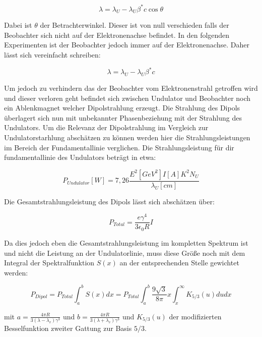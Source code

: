\begin{equation*}
    \lambda = \lambda_U -\lambda_U \beta^*c \cos{\theta}
\end{equation*}

Dabei ist $\theta$ der Betrachterwinkel. Dieser ist von null verschieden falls der Beobachter sich 
nicht auf der Elektronenachse befindet. In den folgenden Experimenten ist der Beobachter jedoch immer
auf der Elektronenachse. Daher lässt sich vereinfacht schreiben:

\begin{equation*}
    \lambda = \lambda_U -\lambda_U \beta^*c
\end{equation*}

Um jedoch zu verhindern das der Beobachter vom Elektronenstrahl getroffen wird und dieser verloren geht
befindet sich zwischen Undulator und Beobachter noch ein Ablenkmagnet welcher Dipolstrahlung erzeugt.
Die Strahlung des Dipols überlagert sich nun mit unbekannter Phasenbeziehung mit der Strahlung des 
Undulators. Um die Relevanz der Dipolstrahlung im Vergleich zur Undulatorstarhlung abschätzen zu können
werden hier die Strahlungsleistungen im Bereich der Fundamentallinie verglichen.
Die Strahlungsleistung für dir fundamentallinie des Undulators beträgt in etwa:

\begin{equation*}
    P_{Undulator} [W] = 7,26\frac{E^2[GeV^2]I[A]K^2N_U}{\lambda_U[cm]} 
\end{equation*}

Die Gesamtstrahlungsleistung des Dipols lässt sich abschätzen über:

\begin{equation}
    P_{Total} = \frac{e\gamma^4}{3\epsilon_0R}I
\end{equation}

Da dies jedoch eben die Gesamtstrahlungsleistung im kompletten Spektrum ist und nicht die Leistung an der 
Undulatorlinie, muss diese Größe noch mit dem Integral der Spektralfunktion $S(x)$ an der entsprechenden 
Stelle gewichtet werden:

\begin{equation*}
    P_{Dipol} = P_{Total} \int_{a}^{b}S(x)dx = P_{Total} \int_{a}^{b} \frac{9\sqrt{3}}{8\pi}x\int_{x}^{\infty}K_{5/3}(u)du dx
\end{equation*}

mit $a = \frac{4\pi R}{3(\lambda-\lambda_{v}) \gamma^3}$ und $b = \frac{4\pi R}{3(\lambda+\lambda_{v}) \gamma^3}$ und $K_{5/3}(u)$
der modifizierten Besselfunktion zweiter Gattung zur Basis $5/3$.

